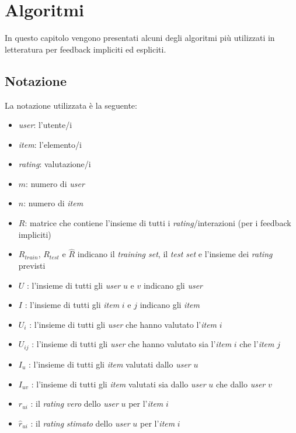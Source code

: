 \chapter{Algoritmi}\label{algoritmi}

In questo capitolo vengono presentati alcuni degli algoritmi più utilizzati in letteratura per feedback impliciti ed espliciti.

\section{Notazione}\label{notazione}

La notazione utilizzata è la seguente:

\begin{itemize}
    \item \textit{user}: l'utente/i
    \item \textit{item}: l'elemento/i
    \item \textit{rating}: valutazione/i
    \item $m$: numero di \textit{user}
    \item $n$: numero di \textit{item}
    \item $R$: matrice che contiene l'insieme di tutti i \textit{rating}/interazioni (per i feedback impliciti)
    \item $R_{train}$, $R_{test}$ e $\hat{R}$ indicano il \textit{training set}, il \textit{test set} e l'insieme dei \textit{rating} previsti
    \item $U$ : l'insieme di tutti gli \textit{user} $u$ e $v$ indicano gli \textit{user}
    \item $I$ : l'insieme di tutti gli \textit{item} $i$ e $j$ indicano gli \textit{item}
    \item $U_i$ : l'insieme di tutti gli \textit{user} che hanno valutato l'\textit{item} $i$
    \item $U_{ij}$ : l'insieme di tutti gli \textit{user} che hanno valutato sia l'\textit{item} $i$ che l'\textit{item} $j$
    \item $I_u$ : l'insieme di tutti gli \textit{item} valutati dallo \textit{user} $u$
    \item $I_{uv}$ : l'insieme di tutti gli \textit{item} valutati sia dallo \textit{user} $u$ che dallo \textit{user} $v$
    \item $r_{ui}$ : il \textit{rating} \textit{vero} dello \textit{user} $u$ per l'\textit{item} $i$
    \item $\hat{r}_{ui}$ : il \textit{rating} \textit{stimato} dello \textit{user} $u$ per l'\textit{item} $i$

\end{itemize}

